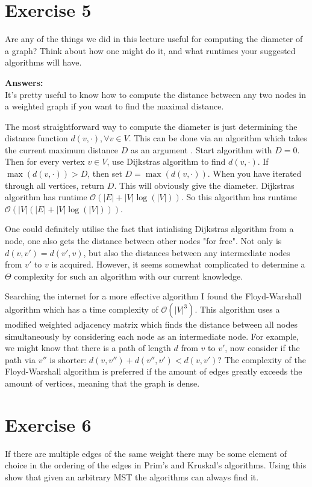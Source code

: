 \documentclass[nobib]{tufte-handout}
\begin{document}
\section{Exercise 5}

Are any of the things we did in this lecture useful for computing the diameter of a graph? Think about how one might do it, and what runtimes your suggested algorithms will have.

\textbf{Answers:}\\

It's pretty useful to know how to compute the distance between any two nodes in a weighted graph if you want to find the maximal distance. 

The most straightforward way to compute the diameter is just determining the distance function  \( d(v, \cdot), \forall v \in V \). This can be done via an algorithm which takes the current maximum distance  \( D \) as an argument . Start algorithm with \( D=0 \). Then for every vertex \( v\in V \), use Dijkstras algorithm to find \( d(v,\cdot) \). If \( \max(d(v,\cdot))>D\), then set \(  D=\max(d(v,\cdot)) \). When you have iterated through all vertices, return \( D\). This will obviously give the diameter. Dijkstras algorithm has runtime \( \mathcal{O}(|E|+|V| \log(|V|)) \). So this algorithm has runtime \( \mathcal{O}(|V|(|E|+|V| \log(|V|))) \). 

One could definitely utilise the fact that intialising Dijkstras algorithm from a node, one also gets the distance between other nodes "for free". Not only is \( d(v,v')=d(v',v) \), but also the distances between any intermediate nodes from \( v' \) to \( v \) is acquired. However, it seems somewhat complicated to determine a \( \Theta \) complexity for such an algorithm with our current knowledge. 

Searching the internet for a more effective algorithm I found the Floyd-Warshall algorithm which has a time complexity of \( \mathcal{O}(|V|^3) \). This algorithm uses a modified weighted adjacency matrix which finds the distance between all nodes simultaneously by considering each node as an intermediate node. For example, we might know that there is a path of length \( d\) from \( v \) to \( v' \), now consider if the path via \( v''\) is shorter: \( d(v,v'')+d(v'',v')<d(v,v') \)? The complexity of the Floyd-Warshall algorithm is preferred if the amount of edges greatly exceeds the amount of vertices, meaning that the graph is dense. 

\newpage
\section{Exercise 6}
If there are multiple edges of the same weight there may be some element of choice in the ordering of the edges in Prim's and Kruskal's algorithms. Using this show that given an arbitrary MST the algorithms can always find it.
\end{document}
